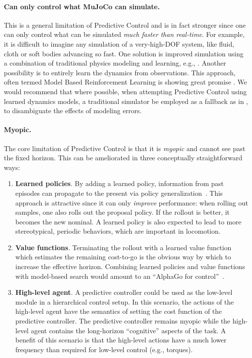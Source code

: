 \paragraph{Can only control what MuJoCo can simulate.} This is a general limitation of Predictive Control and is in fact stronger since one can only control what can be simulated \emph{much faster than real-time}. For example, it is difficult to imagine any simulation of a very-high-DOF system, like fluid, cloth or soft bodies advancing so fast. One solution is improved simulation using a combination of traditional physics modeling and learning, e.g., \cite{ladicky2017physics}. Another possibility is to entirely learn the dynamics from observations. This approach, often termed Model Based Reinforcement Learning is showing great promise \cite{heess2015learning, nagabandi2020deep, wu2022daydreamer}. We would recommend that where possible, when attempting Predictive Control using learned dynamics models, a traditional simulator be employed as a fallback as in \cite{schrittwieser2020mastering}, to disambiguate the effects of modeling errors. 

\paragraph{Myopic.} The core limitation of Predictive Control is that it is \emph{myopic} and cannot see past the fixed horizon. This can be ameliorated in three conceptually straightforward ways:
\begin{enumerate}
	\item \textbf{Learned policies}. By adding a learned policy, information from past episodes can propagate to the present via policy generalization~\cite{byravan2021evaluating}. This approach is attractive since it can only \emph{improve} performance: when rolling out samples, one also rolls out the proposal policy. If the rollout is better, it becomes the new nominal. A learned policy is also expected to lead to more stereotypical, periodic behaviors, which are important in locomotion. 
	\item \textbf{Value functions}. Terminating the rollout with a learned value function which estimates the remaining cost-to-go is the obvious way by which to increase the effective horizon. Combining learned policies and value functions with model-based search would amount to an ``AlphaGo for control''~\cite{silver2016mastering, springenberg2020local}.
	\item \textbf{High-level agent}. A predictive controller could be used as the low-level module in a hierarchical control setup. In this scenario, the actions of the high-level agent have the semantics of setting the cost function of the predictive controller. The predictive controller remains myopic while the high-level agent contains the long-horizon ``cognitive'' aspects of the task. A benefit of this scenario is that the high-level actions have a much lower frequency than required for low-level control (e.g., torques).
\end{enumerate}

